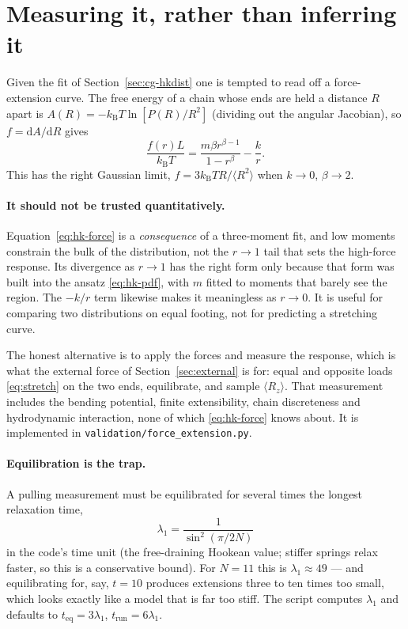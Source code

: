 \documentclass[11pt,a4paper]{report}
\newcommand{\kB}{k_\mathrm{B}}
\newcommand{\code}[1]{\texttt{\seqsplitcode{#1}}}
\newcommand{\seqsplitcode}[1]{#1}
\begin{document}
\section{Measuring it, rather than inferring it}

Given the fit of Section~\ref{sec:cg-hkdist} one is tempted to read off a
force-extension curve. The free energy of a chain whose ends are held a distance
$R$ apart is $A(R) = -\kB T\ln[P(R)/R^{2}]$ (dividing out the angular Jacobian), so
$f = \mathrm{d}A/\mathrm{d}R$ gives
\begin{equation}
  \frac{f(r) L}{\kB T} = \frac{m\beta r^{\beta-1}}{1-r^{\beta}} - \frac{k}{r} .
  \label{eq:hk-force}
\end{equation}
This has the right Gaussian limit, $f = 3\kB T R/\langle R^{2}\rangle$ when
$k\to0$, $\beta\to2$.

\paragraph{It should not be trusted quantitatively.} Equation~\eqref{eq:hk-force}
is a \emph{consequence} of a three-moment fit, and low moments constrain the bulk
of the distribution, not the $r\to1$ tail that sets the high-force response. Its
divergence as $r\to1$ has the right form only because that form was built into the
ansatz \eqref{eq:hk-pdf}, with $m$ fitted to moments that barely see the region.
The $-k/r$ term likewise makes it meaningless as $r\to0$. It is useful for
comparing two distributions on equal footing, not for predicting a stretching
curve.

The honest alternative is to apply the forces and measure the response, which is
what the external force of Section~\ref{sec:external} is for: equal and opposite
loads \eqref{eq:stretch} on the two ends, equilibrate, and sample $\langle
R_z\rangle$. That measurement includes the bending potential, finite
extensibility, chain discreteness and hydrodynamic interaction, none of which
\eqref{eq:hk-force} knows about. It is implemented in
\code{validation/force\_extension.py}.

\paragraph{Equilibration is the trap.} A pulling measurement must be equilibrated
for several times the longest relaxation time,
\begin{equation}
  \lambda_1 = \frac{1}{\sin^{2}\!\left(\pi/2N\right)}
\end{equation}
in the code's time unit (the free-draining Hookean value; stiffer springs relax
faster, so this is a conservative bound). For $N = 11$ this is $\lambda_1\approx49$
--- and equilibrating for, say, $t = 10$ produces extensions three to ten times
too small, which looks exactly like a model that is far too stiff. The script
computes $\lambda_1$ and defaults to $t_{\mathrm{eq}} = 3\lambda_1$,
$t_{\mathrm{run}} = 6\lambda_1$.
\end{document}

